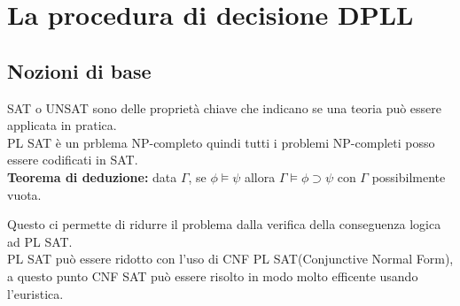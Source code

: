\documentclass[../main.tex]{subfiles}
\begin{document}
    \chapter{La procedura di decisione DPLL}
    \section{Nozioni di base}
    SAT o UNSAT sono delle proprietà chiave che indicano se una teoria può essere applicata in pratica.\\
    PL SAT è un prblema NP-completo quindi tutti i problemi NP-completi posso essere codificati in SAT.\\
    \textbf{Teorema di deduzione:} data $\Gamma$, se $\phi \models \psi$ allora $\Gamma \models \phi \supset \psi$ con $\Gamma$ possibilmente vuota.

    Questo ci permette di ridurre il problema dalla verifica della conseguenza logica ad PL SAT.\\
    PL SAT può essere ridotto con l'uso di CNF PL SAT(Conjunctive Normal Form), a questo punto CNF SAT può essere risolto in modo molto efficente usando l'euristica.
\end{document}
